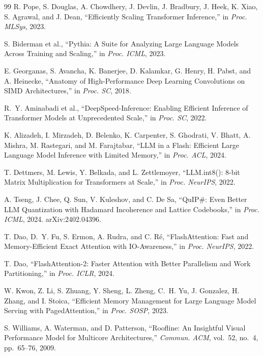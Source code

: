\documentclass[conference]{IEEEtran}
\begin{document}
\begin{thebibliography}{99}
R. Pope, S. Douglas, A. Chowdhery, J. Devlin, J. Bradbury, J. Heek,
K. Xiao, S. Agrawal, and J. Dean,
``Efficiently Scaling Transformer Inference,''
in \textit{Proc. MLSys}, 2023.

S. Biderman et al.,
``Pythia: A Suite for Analyzing Large Language Models Across Training and Scaling,''
in \textit{Proc. ICML}, 2023.

E. Georganas, S. Avancha, K. Banerjee, D. Kalamkar, G. Henry,
H. Pabst, and A. Heinecke,
``Anatomy of High-Performance Deep Learning Convolutions on SIMD Architectures,''
in \textit{Proc. SC}, 2018.

R.~Y. Aminabadi et al.,
``DeepSpeed-Inference: Enabling Efficient Inference of Transformer Models at Unprecedented Scale,''
in \textit{Proc. SC}, 2022.

K. Alizadeh, I. Mirzadeh, D. Belenko, K. Carpenter, S. Ghodrati, V. Bhatt,
A. Mishra, M. Rastegari, and M. Farajtabar,
``LLM in a Flash: Efficient Large Language Model Inference with Limited Memory,''
in \textit{Proc. ACL}, 2024.

T. Dettmers, M. Lewis, Y. Belkada, and L. Zettlemoyer,
``LLM.int8(): 8-bit Matrix Multiplication for Transformers at Scale,''
in \textit{Proc. NeurIPS}, 2022.

A. Tseng, J. Chee, Q. Sun, V. Kuleshov, and C. De Sa,
``QuIP\#: Even Better LLM Quantization with Hadamard Incoherence and Lattice Codebooks,''
in \textit{Proc. ICML}, 2024. arXiv:2402.04396.

T. Dao, D.~Y. Fu, S. Ermon, A. Rudra, and C. R{\'e},
``FlashAttention: Fast and Memory-Efficient Exact Attention with IO-Awareness,''
in \textit{Proc. NeurIPS}, 2022.

T. Dao,
``FlashAttention-2: Faster Attention with Better Parallelism and Work Partitioning,''
in \textit{Proc. ICLR}, 2024.

W. Kwon, Z. Li, S. Zhuang, Y. Sheng, L. Zheng, C.~H. Yu, J. Gonzalez,
H. Zhang, and I. Stoica,
``Efficient Memory Management for Large Language Model Serving with PagedAttention,''
in \textit{Proc. SOSP}, 2023.

S. Williams, A. Waterman, and D. Patterson,
``Roofline: An Insightful Visual Performance Model for Multicore Architectures,''
\textit{Commun. ACM}, vol.~52, no.~4, pp.~65--76, 2009.


\end{thebibliography}
\end{document}
